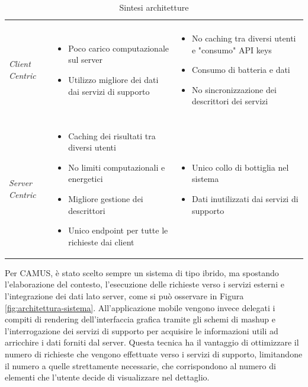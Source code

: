 \begin{table}[ht]
	\caption{Sintesi architetture}
	\label{table:sintesi_architetturei}
	\begin{tabularx}{\textwidth}{lXX}
		\toprule
		\thead{Architettura} & \thead{PROs} & \thead{CONs} \\
		\midrule
		\\ \emph{Client Centric} & 
		\vspace{-6.8mm}
		\begin{itemize}
			\item Poco carico computazionale sul server
			\item Utilizzo migliore dei dati dai servizi di supporto
		\end{itemize} &
		\vspace{-6.8mm}
		\begin{itemize}
			\item No caching tra diversi utenti e "consumo" API keys
			\item Consumo di batteria e dati
			\item No sincronizzazione dei descrittori dei servizi
		\end{itemize} \\
		\hline
		\\ \emph{Server Centric} &
		\vspace{-6.8mm}
		\begin{itemize}
			\item Caching dei risultati tra diversi utenti
			\item No limiti computazionali e energetici
			\item Migliore gestione dei descrittori
			\item Unico endpoint per tutte le richieste dai client
		\end{itemize} &
		\vspace{-6.8mm}
		\begin{itemize}
			\item Unico collo di bottiglia nel sistema
			\item Dati inutilizzati dai servizi di supporto
		\end{itemize}
		\\
		\bottomrule
	\end{tabularx}
\end{table}

Per CAMUS, è stato scelto sempre un sistema di tipo ibrido, ma spostando l'elaborazione del contesto, l'esecuzione delle richieste verso i servizi esterni e l'integrazione dei dati lato server, come si può osservare in Figura \ref{fig:architettura-sistema}. All'ap\-pli\-ca\-zio\-ne mobile vengono invece delegati i compiti di rendering dell'interfaccia grafica tramite gli schemi di mashup e l'interrogazione dei servizi di supporto per acquisire le informazioni utili ad arricchire i dati forniti dal server. Questa tecnica ha il vantaggio di ottimizzare il numero di richieste che vengono effettuate verso i servizi di supporto, limitandone il numero a quelle strettamente necessarie, che corrispondono al numero di elementi che l'utente decide di visualizzare nel dettaglio.

